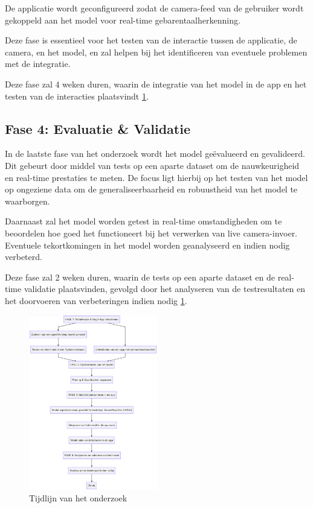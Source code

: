 De applicatie wordt geconfigureerd zodat de camera-feed van de gebruiker wordt gekoppeld aan het model voor real-time gebarentaalherkenning. 

Deze fase is essentieel voor het testen van de interactie tussen de applicatie, de camera, en het model, en zal helpen bij het identificeren van eventuele problemen met de integratie.

Deze fase zal 4 weken duren, waarin de integratie van het model in de app en het testen van de interacties plaatsvindt \ref{fig:flowchart_tijd}.

\subsection{Fase 4: Evaluatie \& Validatie}
In de laatste fase van het onderzoek wordt het model geëvalueerd en gevalideerd. 
Dit gebeurt door middel van tests op een aparte dataset om de nauwkeurigheid en real-time prestaties te meten. 
De focus ligt hierbij op het testen van het model op ongeziene data om de generaliseerbaarheid en robuustheid van het model te waarborgen.

Daarnaast zal het model worden getest in real-time omstandigheden om te beoordelen hoe goed het functioneert bij het verwerken van live camera-invoer. 
Eventuele tekortkomingen in het model worden geanalyseerd en indien nodig verbeterd.

Deze fase zal 2 weken duren, waarin de tests op een aparte dataset en de real-time validatie plaatsvinden, gevolgd door het analyseren van de testresultaten en het doorvoeren van verbeteringen indien nodig \ref{fig:flowchart_tijd}.

\begin{figure}[h!]
  \includegraphics[width=0.5\textwidth]{../graphics/flowchart.png}
  \caption{Tijdlijn van het onderzoek}
  \label{fig:flowchart_tijd}
\end{figure}
